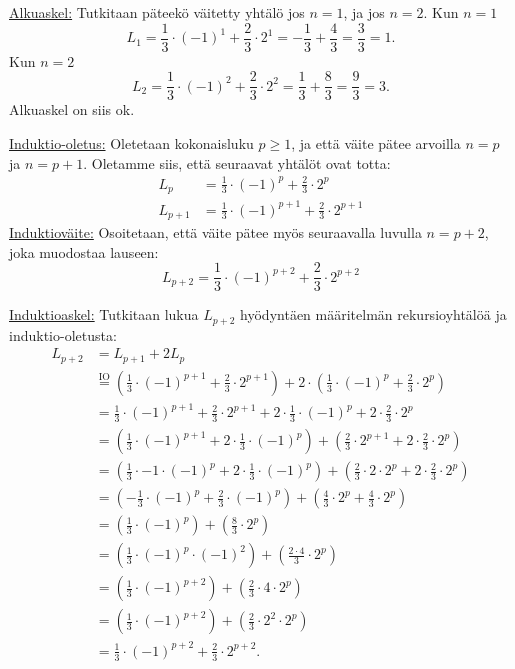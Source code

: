 \documentclass[a4paper,12pt]{article}
\begin{document}
\begin{enumerate}
\underline{Alkuaskel:} Tutkitaan päteekö väitetty yhtälö jos $n=1$, ja jos $n=2$. Kun $n=1$
\begin{equation*}
    L_1=\frac{1}{3}\cdot (-1)^1+\frac{2}{3}\cdot 2^1=-\frac{1}{3}+\frac{4}{3}=\frac{3}{3}=1.
\end{equation*}
Kun $n=2$
\begin{equation*}
    L_2=\frac{1}{3}\cdot (-1)^2+\frac{2}{3}\cdot 2^2=\frac{1}{3}+\frac{8}{3}=\frac{9}{3}=3.
\end{equation*}
Alkuaskel on siis ok. 

\underline{Induktio-oletus:} Oletetaan kokonaisluku $p \geq 1$, ja että väite pätee arvoilla $n=p$ ja $n=p+1$. Oletamme siis, että seuraavat yhtälöt ovat totta:
\begin{align*} L_p &= \frac{1}{3}\cdot (-1)^p+\frac{2}{3}\cdot 2^p \\ 
L_{p+1} &= \frac{1}{3}\cdot (-1)^{p+1}+\frac{2}{3}\cdot 2^{p+1} 
\end{align*}
\underline{Induktioväite:} Osoitetaan, että väite pätee myös seuraavalla luvulla $n=p+2$, joka muodostaa lauseen:
\begin{equation*}
    L_{p+2} = \frac{1}{3}\cdot (-1)^{p+2}+\frac{2}{3}\cdot 2^{p+2} 
\end{equation*}

\underline{Induktioaskel:} Tutkitaan lukua $L_{p+2}$ hyödyntäen määritelmän rekursioyhtälöä ja induktio-oletusta:
\begin{align*}
    L_{p+2}&=L_{p+1}+2L_p\\
    &\stackrel{\text{IO}}{=}(\frac{1}{3}\cdot (-1)^{p+1}+\frac{2}{3}\cdot 2^{p+1})+2\cdot (\frac{1}{3}\cdot (-1)^p+\frac{2}{3}\cdot 2^p)\\
    &=\frac{1}{3}\cdot (-1)^{p+1}+\frac{2}{3}\cdot 2^{p+1}+2\cdot \frac{1}{3}\cdot (-1)^p+2\cdot \frac{2}{3}\cdot 2^p\\
    &=(\frac{1}{3}\cdot (-1)^{p+1}+2\cdot \frac{1}{3}\cdot (-1)^p)+(\frac{2}{3}\cdot 2^{p+1}+2\cdot \frac{2}{3}\cdot 2^p)\\
    &=(\frac{1}{3}\cdot -1\cdot (-1)^{p}+2\cdot \frac{1}{3}\cdot (-1)^p)+(\frac{2}{3}\cdot 2\cdot 2^{p}+2\cdot \frac{2}{3}\cdot 2^p)\\
    &=(-\frac{1}{3}\cdot (-1)^p+\frac{2}{3}\cdot(-1)^p)+(\frac{4}{3}\cdot 2^p+\frac{4}{3}\cdot 2^p)\\
    &=(\frac{1}{3}\cdot(-1)^p)+(\frac{8}{3}\cdot 2^p)\\
    &=(\frac{1}{3}\cdot(-1)^p\cdot (-1)^2)+(\frac{2\cdot 4}{3}\cdot 2^p)\\
    &=(\frac{1}{3}\cdot(-1)^{p+2})+(\frac{2}{3}\cdot 4\cdot 2^p)\\
    &=(\frac{1}{3}\cdot(-1)^{p+2})+(\frac{2}{3}\cdot 2^2\cdot 2^p)\\
    &=\frac{1}{3}\cdot(-1)^{p+2}+\frac{2}{3}\cdot 2^{p+2}.\\
\end{align*}


\end{enumerate}
\end{document}
